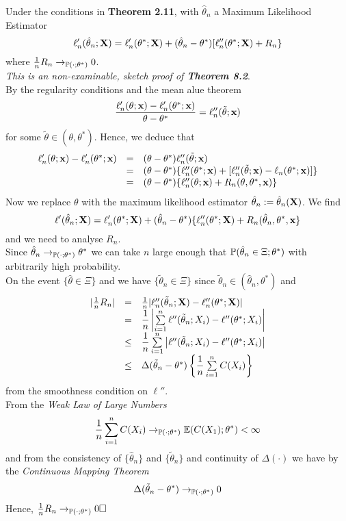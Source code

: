 \documentclass[11pt,a4paper]{article}
\begin{document}
Under the conditions in \textbf{Theorem 2.11}, with $\hat\theta_n$ a Maximum Likelihood Estimator
$$\ell'_n(\hat\theta_n;\textbf{X})=\ell'_n(\theta^*;\textbf{X})+(\hat\theta_n-\theta^*)[\ell''_n(\theta^*;\textbf{X})+R_n\}$$
where $\frac{1}{n}R_n\to_{\mathbb{P}(\cdot;\theta^*)}0$.\\

\textit{This is an non-examinable, sketch proof of \textbf{Theorem 8.2}}.\\
By the regularity conditions and the mean alue theorem
$$\frac{\ell_n'(\theta;\textbf{x})-\ell'_n(\theta^*;\textbf{x})}{\theta-\theta^*}=\ell''_n(\tilde{\theta};\textbf{x})$$
for some $\tilde{\theta}\in(\theta,\theta^*)$. Hence, we deduce that
\[\begin{array}{rcl}
\ell'_n(\theta;\textbf{x})-\ell_n'(\theta^*;\textbf{x})&=&(\theta-\theta^*)\ell''_n(\tilde{\theta};\textbf{x})\\
&=&(\theta-\theta^*)\{\ell''_n(\theta^*;\textbf{x})+[\ell''_n(\tilde{\theta};\textbf{x})-\ell_n(\theta^*;\textbf{x})]\}\\
&=&(\theta-\theta^*)\{\ell''_n(\theta;\textbf{x})+R_n(\theta,\theta^*,\textbf{x})\}
\end{array}\]
Now we replace $\theta$ with the maximum likelihood estimator $\hat{\theta}_n:=\hat{\theta}_n(\textbf{X})$. We find
$$\ell'(\hat{\theta}_n;\textbf{X})=\ell'_n(\theta^*;\textbf{X})+(\hat{\theta}_n-\theta^*)\{\ell''_n(\theta^*;\textbf{X})+R_n(\hat{\theta}_n,\theta^*,\textbf{x}\}$$
and we need to analyse $R_n$.\\
Since $\hat{\theta}_n\to_{\mathbb{P}(\cdot;\theta^*)}\theta^*$ we can take $n$ large enough that $\mathbb{P}(\hat{\theta}_n\in\Xi;\theta^*)$ with arbitrarily high probability.\\
On the event $\{\hat{\theta}\in\Xi\}$ and we have $\{\tilde{\theta}_n\in\Xi\}$ since $\tilde{\theta}_n\in(\hat{\theta}_n,\theta^*)$ and
\[\begin{array}{rcl}
|\frac{1}{n}R_n|&=&\frac{1}{n}|\ell''_n(\tilde{\theta}_n;\textbf{X})-\ell_n''(\theta^*;\textbf{X})|\\
&=&\dfrac{1}{n}\left|\sum\limits_{i=1}^n\ell''(\tilde{\theta}_n;X_i)-\ell''(\theta^*;X_i)\right|\\
&\leq&\dfrac{1}{n}\sum\limits_{i=1}^n\left|\ell''(\tilde{\theta}_n;X_i)-\ell''(\theta^*;X_i)\right|\\
&\leq&\Delta(\tilde{\theta}_n-\theta^*)\left\{\dfrac{1}{n}\sum\limits_{i=1}^nC(X_i)\right\}
\end{array}\]
from the smoothness condition on $\ell''$.\\
From the \textit{Weak Law of Large Numbers}
$$\frac{1}{n}\sum_{i=1}^nC(X_i)\to_{\mathbb{P}(\cdot;\theta^*)}\mathbb{E}(C(X_1);\theta^*)<\infty$$
and from the consistency of $\{\hat{\theta}_n\}$ and $\{\tilde{\theta}_n\}$ and continuity of $\Delta(\cdot)$ we have by the \textit{Continuous Mapping Theorem}
$$\Delta(\tilde{\theta}_n-\theta^*)\to_{\mathbb{P}(\cdot;\theta^*)}0$$
Hence, $\frac{1}{n}R_n\to_{\prob(\cdot;\theta^*)}0\hfill\square$
\end{document}
